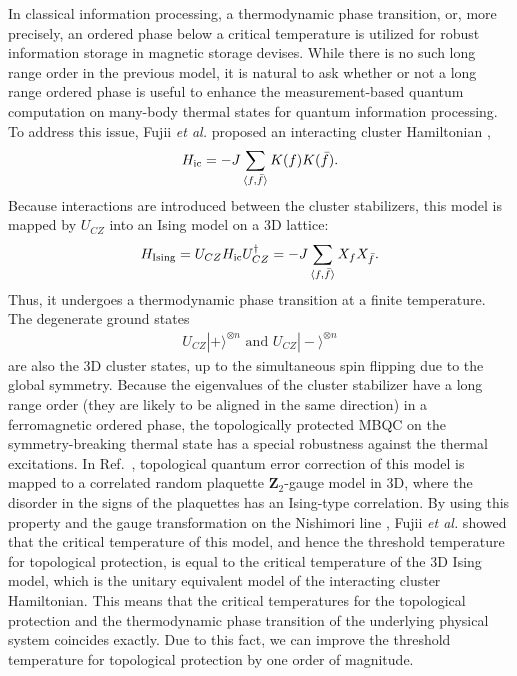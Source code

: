 In classical information processing, a thermodynamic phase transition, or, more precisely, an ordered phase below a critical temperature is utilized for robust information storage in magnetic storage devises.
While there is no such long range order in the previous model, it is natural to ask whether or not a long range ordered phase is useful to enhance the measurement-based quantum computation on many-body thermal states for quantum information processing.
To address this issue, Fujii {\it et al.} proposed an interacting cluster Hamiltonian \cite{FujiiNakata},
\begin{eqnarray*}
H_{\rm ic} = -J \sum _{\langle f,\bar f \rangle } K(f)K(\bar f).
\end{eqnarray*}
Because interactions are introduced between the cluster stabilizers, this model is mapped by $U_{CZ}$ into an Ising model on a 3D lattice:
\begin{eqnarray*}
H_{\rm Ising} = U_{CZ}H_{\rm ic} U_{CZ}^{\dag} 
= -J \sum _{\langle f,\bar f \rangle } X_f X_{\bar f}.
\end{eqnarray*}
Thus, it undergoes a thermodynamic phase transition at a finite temperature.
The degenerate ground states
\begin{eqnarray}
U_{CZ}|+\rangle^{\otimes n} \textrm{ and } U_{CZ}|-\rangle^{\otimes n}
\end{eqnarray} 
are also the 3D cluster states, up to the simultaneous spin flipping due to the global symmetry.
Because the eigenvalues of the cluster stabilizer have a long range order (they are likely to be aligned in the same direction) in a ferromagnetic ordered phase, the topologically protected MBQC on the symmetry-breaking thermal state has a special robustness against the thermal excitations.
In Ref.~\cite{FujiiNakata}, topological quantum error correction of this model is mapped to a correlated random plaquette $\mathbf{Z}_2$-gauge model in 3D, where the disorder in the signs of the plaquettes has an Ising-type correlation.
By using this property and the gauge transformation on the Nishimori line \cite{NishimoriBook}, Fujii {\it et al.} showed that the critical temperature of this model, and hence the threshold temperature for topological protection, is equal to the critical temperature of the 3D Ising model, which is the unitary equivalent model of the interacting cluster Hamiltonian.
This means that the critical temperatures for the topological protection and the thermodynamic phase transition of the underlying physical system coincides exactly.
Due to this fact, we can improve the threshold temperature for topological protection by one order of magnitude.

